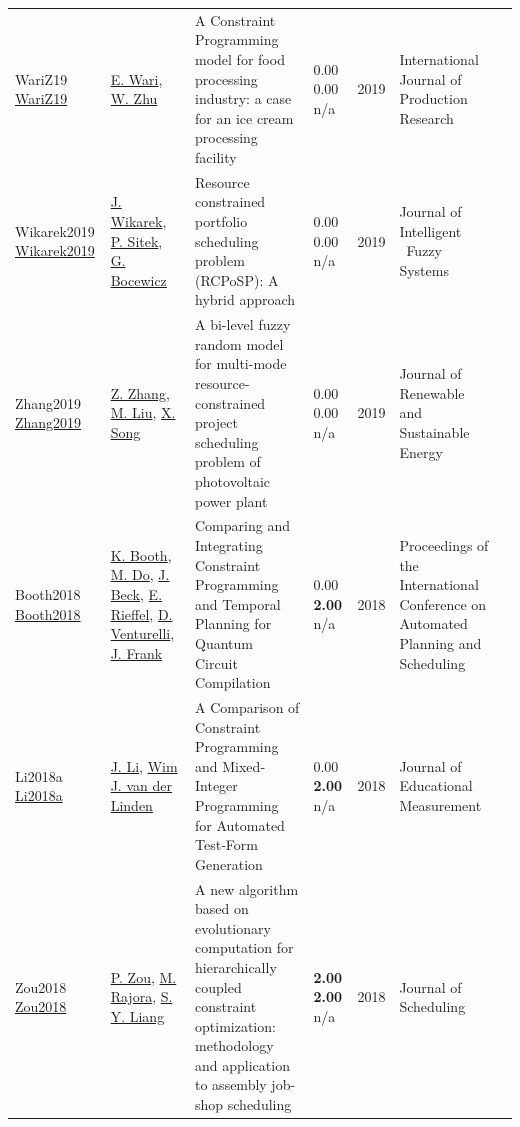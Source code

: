 {\begin{longtable}{p{3cm}p{5cm}p{10cm}p{1cm}rp{2.5cm}l}
WariZ19 \href{http://dx.doi.org/10.1080/00207543.2019.1571250}{WariZ19} & \hyperref[auth:a838]{E. Wari}, \hyperref[auth:a839]{W. Zhu} & A Constraint Programming model for food processing industry: a case for an ice cream processing facility & \noindent{}\textcolor{black!50}{0.00} \textcolor{black!50}{0.00} n/a & 2019 & \cellcolor{red!20}International Journal of Production Research & \cite{WariZ19}\\
Wikarek2019 \href{http://dx.doi.org/10.3233/jifs-179364}{Wikarek2019} & \hyperref[auth:a534]{J. Wikarek}, \hyperref[auth:a1474]{P. Sitek}, \hyperref[auth:a629]{G. Bocewicz} & Resource constrained portfolio scheduling problem (RCPoSP): A hybrid approach & \noindent{}\textcolor{black!50}{0.00} \textcolor{black!50}{0.00} n/a & 2019 & Journal of Intelligent \  Fuzzy Systems & \cite{Wikarek2019}\\
Zhang2019 \href{http://dx.doi.org/10.1063/1.5053623}{Zhang2019} & \hyperref[auth:a1742]{Z. Zhang}, \hyperref[auth:a1743]{M. Liu}, \hyperref[auth:a1744]{X. Song} & A bi-level fuzzy random model for multi-mode resource-constrained project scheduling problem of photovoltaic power plant & \noindent{}\textcolor{black!50}{0.00} \textcolor{black!50}{0.00} n/a & 2019 & Journal of Renewable and Sustainable Energy & \cite{Zhang2019}\\
Booth2018 \href{https://doi.org/10.1609/icaps.v28i1.13920}{Booth2018} & \hyperref[auth:a2145]{K. Booth}, \hyperref[auth:a808]{M. Do}, \hyperref[auth:a2146]{J. Beck}, \hyperref[auth:a2147]{E. Rieffel}, \hyperref[auth:a811]{D. Venturelli}, \hyperref[auth:a379]{J. Frank} & \cellcolor{gold!20}Comparing and Integrating Constraint Programming and Temporal Planning for Quantum Circuit Compilation & \noindent{}\textcolor{black!50}{0.00} \textbf{2.00} n/a & 2018 & Proceedings of the International Conference on Automated Planning and Scheduling & \cite{Booth2018}\\
Li2018a \href{https://doi.org/10.1111/jedm.12187}{Li2018a} & \hyperref[auth:a2193]{J. Li}, \hyperref[auth:a2194]{Wim J. van der Linden} & A Comparison of Constraint Programming and Mixed‐Integer Programming for Automated Test‐Form Generation & \noindent{}\textcolor{black!50}{0.00} \textbf{2.00} n/a & 2018 & Journal of Educational Measurement & \cite{Li2018a}\\
Zou2018 \href{https://doi.org/10.1007/s10951-018-0572-2}{Zou2018} & \hyperref[auth:a2190]{P. Zou}, \hyperref[auth:a2191]{M. Rajora}, \hyperref[auth:a2192]{S. Y. Liang} & A new algorithm based on evolutionary computation for hierarchically coupled constraint optimization: methodology and application to assembly job-shop scheduling & \noindent{}\textbf{2.00} \textbf{2.00} n/a & 2018 & Journal of Scheduling & \cite{Zou2018}\\

\end{longtable}}
